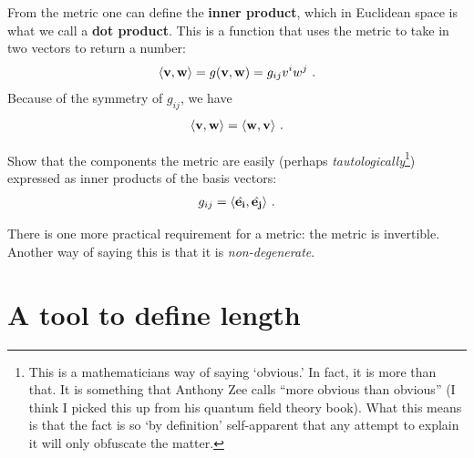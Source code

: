 \documentclass[12pt, oneside]{report}    %
\let\oldsection\section
\def\section{%
  \setcounter{sidenote}{1}%
  \oldsection
}
\begin{document}
From the metric one can define the \textbf{inner product}, which in Euclidean space is what we call a \textbf{dot product}. This is a function that uses the metric to take in two vectors to return a number:
\begin{align}
    \langle \mathbf{v},\mathbf{w} \rangle = g(\mathbf{v},\mathbf{w})
    = g_{ij} v^i w^j \ .
\end{align}
Because of the symmetry of $g_{ij}$, we have
\begin{align}
    \langle \mathbf{v}, \mathbf{w} \rangle = \langle \mathbf{w}, \mathbf{v} \rangle \ .
\end{align}



\begin{exercise}
Show that the components the metric are easily (perhaps \emph{tautologically}\footnote{This is a mathematicians way of saying `obvious.' In fact, it is more than that. It is something that Anthony Zee calls ``more obvious than obvious'' (I think I picked this up from his quantum field theory book). What this means is that the fact is so `by definition' self-apparent that any attempt to explain it will only obfuscate the matter.}) expressed as inner products of the basis vectors:
\begin{align}
    g_{ij} = \langle \hat{\mathbf{e_i}}, \hat{\mathbf{e_j}}\rangle \ .
\end{align}
\end{exercise}

There is one more practical requirement for a metric: the metric is invertible. Another way of saying this is that it is \emph{non-degenerate}. 

\section{A tool to define length}
\end{document}
